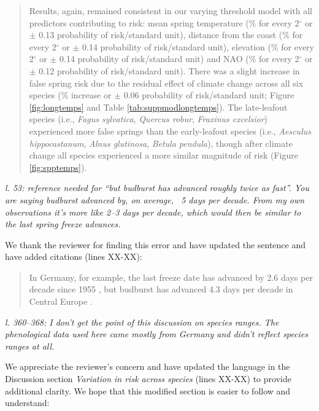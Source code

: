 \documentclass[11pt,a4paper]{article}
\begin{document}
\begin{quotation}
\noindent  Results, again, remained consistent in our varying threshold model with all predictors contributing to risk: mean spring temperature (\% for every 2$^\circ$ or  $\pm$ 0.13 probability of risk/standard unit), distance from the coast (\% for every 2$^\circ$ or  $\pm$ 0.14 probability of risk/standard unit), elevation (\% for every 2$^\circ$ or  $\pm$ 0.14 probability of risk/standard unit) and NAO (\% for every 2$^\circ$ or  $\pm$ 0.12 probability of risk/standard unit). There was a slight increase in false spring risk due to the residual effect of climate change across all six species (\% increase or  $\pm$ 0.06 probability of risk/standard unit; Figure \ref{fig:longtemps} and Table \ref{tab:suppmodlongtemps}). The late-leafout species (i.e., \textit{Fagus sylvatica}, \textit{Quercus robur}, \textit{Fraxinus excelsior}) experienced more false springs than the early-leafout species (i.e., \textit{Aesculus hippocastanum}, \textit{Alnus glutinosa}, \textit{Betula pendula}), though after climate change all species experienced a more similar magnitude of risk (Figure \ref{fig:spptemps}). 
\end{quotation}

\textit{l. 53: reference needed for “but budburst has advanced roughly twice as fast”. You are saying budburst advanced by, on average, ~5 days per decade. From my own observations it’s more like 2–3 days per decade, which would then be similar to the last spring freeze advances.}

We thank the reviewer for finding this error and have updated the sentence and have added citations (lines XX-XX):

\begin{quotation}
\noindent  In Germany, for example, the last freeze date has advanced by 2.6 days per decade since 1955 \citep{Zohner2016}, but budburst has advanced 4.3 days per decade in Central Europe \citep{Fu2014,Vitasse2018}.
\end{quotation}


\textit{l. 360–368: I don’t get the point of this discussion on species ranges. The phenological data used here came mostly from Germany and didn’t reflect species ranges at all.}

We appreciate the reviewer's concern and have updated the language in the Discussion section \textit{Variation in risk across species} (lines XX-XX) to provide additional clarity. We hope that this modified section is easier to follow and understand: 
\end{document}
